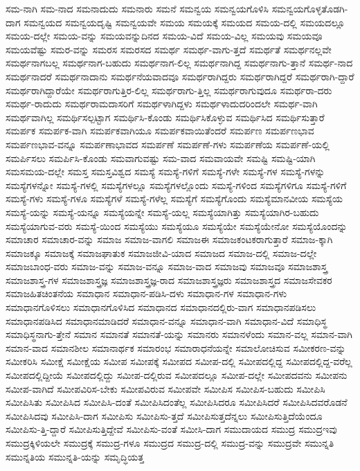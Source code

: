 {ಸಮ-ನಾಗಿ
ಸಮ-ನಾದ
ಸಮನಾದುದು
ಸಮನಾರು
ಸಮನೆ
ಸಮನ್ವಯ
ಸಮನ್ವಯಗೊಳಿಸಿ
ಸಮನ್ವಯಗೊಳ್ಳತೊಡಗಿ-ದಾಗ
ಸಮನ್ವಯದ
ಸಮನ್ವಯದೃಷ್ಟಿ
ಸಮನ್ವಯವೇ
ಸಮಯ
ಸಮಯಕ್ಕೆ
ಸಮಯದ
ಸಮಯ-ದಲ್ಲಿ
ಸಮಯದಲ್ಲೂ
ಸಮಯ-ದಲ್ಲೇ
ಸಮಯ-ವನ್ನು
ಸಮಯವನ್ನುದಿನದ
ಸಮಯ-ವಿದೆ
ಸಮಯ-ವಿಲ್ಲ
ಸಮಯವು
ಸಮಯವೂ
ಸಮಯವೆಷ್ಟು
ಸಮರ-ವನ್ನು
ಸಮರಸ
ಸಮರಸದ
ಸಮರ್ಥ
ಸಮರ್ಥ-ವಾಗು-ತ್ತದೆ
ಸಮರ್ಥತೆ
ಸಮರ್ಥನಲ್ಲವೇ
ಸಮರ್ಥನಾಗಬಲ್ಲ
ಸಮರ್ಥನಾಗ-ಬಹುದು
ಸಮರ್ಥನಾಗ-ಲಿಲ್ಲ
ಸಮರ್ಥನಾಗಿದ್ದ
ಸಮರ್ಥನಾಗು-ತ್ತಾನೆ
ಸಮರ್ಥ-ನಾದ
ಸಮರ್ಥನಾದರೆ
ಸಮರ್ಥನಾದಾನು
ಸಮರ್ಥನೆಯವಾದವೂ
ಸಮರ್ಥರಾಗಿದ್ದರು
ಸಮರ್ಥರಾಗಿದ್ದರೆ
ಸಮರ್ಥರಾಗಿ-ದ್ದಾರೆ
ಸಮರ್ಥರಾಗಿದ್ದಾರೆಯೇ
ಸಮರ್ಥರಾಗುತ್ತಿರ-ಲಿಲ್ಲ
ಸಮರ್ಥರಾಗು-ತ್ತಿಲ್ಲ
ಸಮರ್ಥರಾಗುವುದೂ
ಸಮರ್ಥರಾ-ದರು
ಸಮರ್ಥ-ರಾದುದು
ಸಮರ್ಥರಾಮದಾಸರಿಗೆ
ಸಮರ್ಥಳಾಗಿದ್ದಳು
ಸಮರ್ಥಳಾದುದರಿಂದಲೇ
ಸಮರ್ಥ-ವಾಗಿ
ಸಮರ್ಥವಾಗಿಲ್ಲ
ಸಮರ್ಥಿಸಲ್ಪಟ್ಟಾಗ
ಸಮರ್ಥಿಸಿ-ಕೊಂಡು
ಸಮರ್ಥಿಸಿಕೊಳ್ಳುವ
ಸಮರ್ಥಿಸಿದ
ಸಮರ್ಥಿಸುತ್ತಾರೆ
ಸಮರ್ಪಕ
ಸಮರ್ಪಕ-ವಾಗಿ
ಸಮರ್ಪಕವಾಗಿಯೂ
ಸಮರ್ಪಕವಾಯಿತೆಂದರೆ
ಸಮರ್ಪಣ
ಸಮರ್ಪಣಭಾವ
ಸಮರ್ಪಣಭಾವ-ವನ್ನೂ
ಸಮರ್ಪಣಾಭಾವದ
ಸಮರ್ಪಣೆ
ಸಮರ್ಪಣೆ-ಗಳು
ಸಮರ್ಪಣೆಯ
ಸಮರ್ಪಣೆ-ಯಲ್ಲಿ
ಸಮರ್ಪಿಸಲು
ಸಮರ್ಪಿಸಿ-ಕೊಂಡು
ಸಮವಾಗುವಷ್ಟು
ಸಮ-ವಾದ
ಸಮವಾಯವೇ
ಸಮಷ್ಟಿ
ಸಮಷ್ಟಿ-ಯಾಗಿ
ಸಮಸಮಯ-ದಲ್ಲೇ
ಸಮಸ್ತ
ಸಮಸ್ತವಿಶ್ವದ
ಸಮಸ್ಯೆ
ಸಮಸ್ಯೆ-ಗಳಿಗೆ
ಸಮಸ್ಯೆ-ಗಳೇ
ಸಮಸ್ಯೆ-ಗಳ
ಸಮಸ್ಯೆ-ಗಳನ್ನು
ಸಮಸ್ಯೆಗಳನ್ನೋ
ಸಮಸ್ಯೆ-ಗಳಲ್ಲಿ
ಸಮಸ್ಯೆಗಳಲ್ಲೂ
ಸಮಸ್ಯೆಗಳಲ್ಲೊಂದು
ಸಮಸ್ಯೆ-ಗಳಿಂದ
ಸಮಸ್ಯೆಗಳಿಗೂ
ಸಮಸ್ಯೆ-ಗಳಿಗೆ
ಸಮಸ್ಯೆ-ಗಳು
ಸಮಸ್ಯೆ-ಗಳೂ
ಸಮಸ್ಯೆಗಳೆ
ಸಮಸ್ಯೆ-ಗಳೆಲ್ಲ
ಸಮಸ್ಯೆಗೆ
ಸಮಸ್ಯೆಗೊಂದು
ಸಮಸ್ಯೆಮಾನವೀಯ
ಸಮಸ್ಯೆಯ
ಸಮಸ್ಯೆ-ಯನ್ನು
ಸಮಸ್ಯೆ-ಯನ್ನೂ
ಸಮಸ್ಯೆಯನ್ನೇ
ಸಮಸ್ಯೆ-ಯಲ್ಲ
ಸಮಸ್ಯೆಯಾಗಿತ್ತು
ಸಮಸ್ಯೆಯಾಗಿರ-ಬಹುದು
ಸಮಸ್ಯೆಯಾಗುವ-ವರು
ಸಮಸ್ಯೆ-ಯಿಂದ
ಸಮಸ್ಯೆಯು
ಸಮಸ್ಯೆಯೂ
ಸಮಸ್ಯೆಯೇ
ಸಮಸ್ಯೆಯೇನೋ
ಸಮಸ್ಯೆಯೊಂದನ್ನು
ಸಮಾಚಾರ
ಸಮಾಚಾರ-ವನ್ನು
ಸಮಾಜ
ಸಮಾಜ-ವಾಗಲಿ
ಸಮಾಜಈ
ಸಮಾಜಕಂಟಕರಾಗುತ್ತಾರೆ
ಸಮಾಜ-ಕ್ಕಾಗಿ
ಸಮಾಜಕ್ಕೂ
ಸಮಾಜಕ್ಕೆ
ಸಮಾಜಘಾತುಕ
ಸಮಾಜಜೀವಿ-ಯಾದ
ಸಮಾಜದ
ಸಮಾಜ-ದಲ್ಲಿ
ಸಮಾಜ-ದಲ್ಲೇ
ಸಮಾಜಬಾಂಧ-ವರು
ಸಮಾಜ-ವನ್ನು
ಸಮಾಜ-ವನ್ನೂ
ಸಮಾಜ-ವಾದ
ಸಮಾಜವು
ಸಮಾಜವೂ
ಸಮಾಜಶಾಸ್ತ್ರ
ಸಮಾಜಶಾಸ್ತ್ರ-ಗಳ
ಸಮಾಜಶಾಸ್ತ್ರಜ್ಞ
ಸಮಾಜಶಾಸ್ತ್ರಜ್ಞ-ರಾದ
ಸಮಾಜಶಾಸ್ತ್ರಜ್ಞರು
ಸಮಾಜಶಾಸ್ತ್ರದ
ಸಮಾಜಸೇವಕರ
ಸಮಾಜಹಿತಚಿಂತನೆಯ
ಸಮಾಧಾನ
ಸಮಾಧಾನ-ಪಡಿಸಿ-ದಳು
ಸಮಾಧಾನ-ಗಳ
ಸಮಾಧಾನ-ಗಳು
ಸಮಾಧಾನಗೊಳಿಸಲು
ಸಮಾಧಾನಗೊಳಿಸಿದ
ಸಮಾಧಾನದ
ಸಮಾಧಾನದಲ್ಲಿರು-ವಾಗ
ಸಮಾಧಾನಪಡಿಸಲು
ಸಮಾಧಾನಪಡಿಸಿದ
ಸಮಾಧಾನಮಾಡಿದರೆ
ಸಮಾಧಾನ-ವನ್ನೂ
ಸಮಾಧಾನ-ವಾಗಿ
ಸಮಾಧಾನ-ವಿದೆ
ಸಮಾಧಿಸ್ಥ
ಸಮಾಧಿಸ್ಥನಾಗು-ತ್ತೇನೆ
ಸಮಾನ
ಸಮಾನತೆ
ಸಮಾನತೆ-ಯನ್ನು
ಸಮಾನರು
ಸಮಾನಳೆಂದು
ಸಮಾನ-ವಲ್ಲ
ಸಮಾನ-ವಾಗಿ
ಸಮಾನ-ವಾದ
ಸಮಾನಶೀಲ
ಸಮಾನಾರ್ಥಕ
ಸಮಾರಂಭ
ಸಮಾರಾಧನೆಯನ್ನೇ
ಸಮಾಲೋಚಿಸುವ
ಸಮೀಕರಣ-ವನ್ನು
ಸಮೀಕರಿಸಿ
ಸಮೀಕ್ಷೆ
ಸಮೀಕ್ಷೆಯ
ಸಮೀಪ
ಸಮೀಪಕ್ಕೆ
ಸಮೀಪದ
ಸಮೀಪ-ದಲ್ಲಿ
ಸಮೀಪದಲ್ಲಿದ್ದ
ಸಮೀಪದಲ್ಲಿದ್ದ-ವರೆಲ್ಲ
ಸಮೀಪದಲ್ಲಿದ್ದೀಯೆ
ಸಮೀಪದಲ್ಲಿದ್ದು
ಸಮೀಪ-ದಲ್ಲಿರುವ
ಸಮೀಪದಲ್ಲೂ
ಸಮೀಪ-ದಲ್ಲೇ
ಸಮೀಪದವನು
ಸಮೀಪನು
ಸಮೀಪ-ವಾಗಿದೆ
ಸಮೀಪವಿರಿಸ-ಬೇಕು
ಸಮೀಪವಿರುವ
ಸಮೀಪವೇ
ಸಮೀಪಿಸ
ಸಮೀಪಿಸ-ಬಹುದು
ಸಮೀಪಿಸಿ
ಸಮೀಪಿಸಿತು
ಸಮೀಪಿಸಿದ
ಸಮೀಪಿಸಿ-ದಂತೆ
ಸಮೀಪಿಸಿದಂತೆಲ್ಲ
ಸಮೀಪಿಸಿದರೂ
ಸಮೀಪಿಸಿದರೆ
ಸಮೀಪಿಸಿದವರೊಡನೆ
ಸಮೀಪಿಸಿದವು
ಸಮೀಪಿಸಿ-ದಾಗ
ಸಮೀಪಿಸು
ಸಮೀಪಿಸು-ತ್ತದೆ
ಸಮೀಪಿಸುತ್ತದೆನ್ನಲು
ಸಮೀಪಿಸುತ್ತಿದೆಯೆಂದೂ
ಸಮೀಪಿಸು-ತ್ತಿ-ದ್ದಾರೆ
ಸಮೀಪಿಸುತ್ತಿದ್ದೇವೆ
ಸಮೀಪಿಸು-ವಂತೆ
ಸಮೀಸಿ-ದಾಗ
ಸಮುದಾಯದ
ಸಮುದ್ರ
ಸಮುದ್ರಇವು
ಸಮುದ್ರಕ್ಕಿಳಿಯಲೇ
ಸಮುದ್ರಕ್ಕೆ
ಸಮುದ್ರ-ಗಳೂ
ಸಮುದ್ರದ
ಸಮುದ್ರ-ದಲ್ಲಿ
ಸಮುದ್ರ-ವನ್ನು
ಸಮುದ್ರವೇ
ಸಮುನ್ನತಿ
ಸಮುನ್ನತಿಯ
ಸಮುನ್ನತಿ-ಯನ್ನು
ಸಮೃದ್ಧಿಯತ್ತ
}
